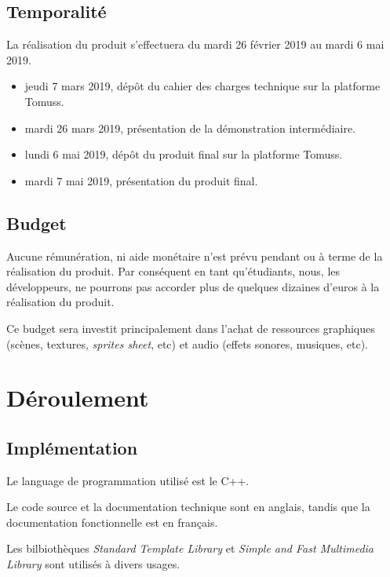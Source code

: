 \documentclass[french]{report}
\begin{document}
\section{Temporalité}

    La réalisation du produit s'effectuera du mardi 26 février 2019 au mardi 6 mai 2019.
    \begin{itemize}[label=$\bullet$]
        \item jeudi 7 mars 2019, dépôt du cahier des charges technique
        sur la platforme Tomuss.
        \item mardi 26 mars 2019, présentation de la démonstration intermédiaire.
        \item lundi 6 mai 2019, dépôt du produit final sur la platforme Tomuss.
        \item mardi 7 mai 2019, présentation du produit final.
    \end{itemize}

\section{Budget}

    Aucune rémunération, ni aide monétaire n'est prévu
    pendant ou à terme de la réalisation du produit.
    Par conséquent en tant qu'étudiants, nous, les développeurs, 
    ne pourrons pas accorder plus de quelques dizaines d'euros à la réalisation du produit.

    Ce budget sera investit principalement dans l'achat de ressources graphiques
    (scènes, textures, \textit{sprites sheet}, etc)
    et audio (effets sonores, musiques, etc).

\chapter{Déroulement}

\section{Implémentation}

    Le language de programmation utilisé est le C++.

    Le code source et la documentation technique sont en anglais,
    tandis que la documentation fonctionnelle est en français.
    
    Les bilbiothèques \textit{Standard Template Library}
    et \textit{Simple and Fast Multimedia Library}
    sont utilisés à divers usages.
\end{document}
